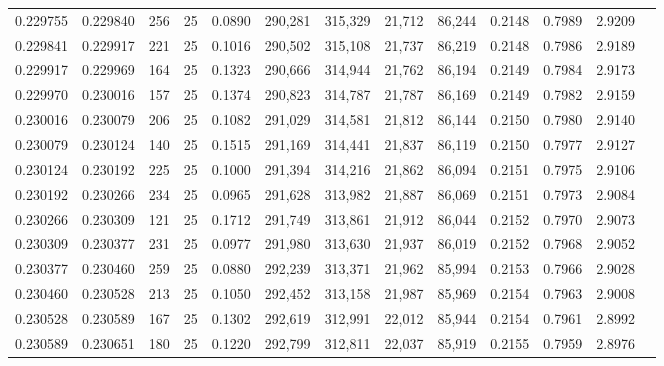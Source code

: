 \begin{tabular}{rrrrrrrrrrrrr}
0.229755 & 0.229840 &   256 &  25 &                                     0.0890 & 290,281 & 315,329 &  21,712 &  86,244 & 0.2148 & 0.7989 & 2.9209 \\
0.229841 & 0.229917 &   221 &  25 &                                     0.1016 & 290,502 & 315,108 &  21,737 &  86,219 & 0.2148 & 0.7986 & 2.9189 \\
0.229917 & 0.229969 &   164 &  25 &                                     0.1323 & 290,666 & 314,944 &  21,762 &  86,194 & 0.2149 & 0.7984 & 2.9173 \\
0.229970 & 0.230016 &   157 &  25 &                                     0.1374 & 290,823 & 314,787 &  21,787 &  86,169 & 0.2149 & 0.7982 & 2.9159 \\
0.230016 & 0.230079 &   206 &  25 &                                     0.1082 & 291,029 & 314,581 &  21,812 &  86,144 & 0.2150 & 0.7980 & 2.9140 \\
0.230079 & 0.230124 &   140 &  25 &                                     0.1515 & 291,169 & 314,441 &  21,837 &  86,119 & 0.2150 & 0.7977 & 2.9127 \\
0.230124 & 0.230192 &   225 &  25 &                                     0.1000 & 291,394 & 314,216 &  21,862 &  86,094 & 0.2151 & 0.7975 & 2.9106 \\
0.230192 & 0.230266 &   234 &  25 &                                     0.0965 & 291,628 & 313,982 &  21,887 &  86,069 & 0.2151 & 0.7973 & 2.9084 \\
0.230266 & 0.230309 &   121 &  25 &                                     0.1712 & 291,749 & 313,861 &  21,912 &  86,044 & 0.2152 & 0.7970 & 2.9073 \\
0.230309 & 0.230377 &   231 &  25 &                                     0.0977 & 291,980 & 313,630 &  21,937 &  86,019 & 0.2152 & 0.7968 & 2.9052 \\
0.230377 & 0.230460 &   259 &  25 &                                     0.0880 & 292,239 & 313,371 &  21,962 &  85,994 & 0.2153 & 0.7966 & 2.9028 \\
0.230460 & 0.230528 &   213 &  25 &                                     0.1050 & 292,452 & 313,158 &  21,987 &  85,969 & 0.2154 & 0.7963 & 2.9008 \\
0.230528 & 0.230589 &   167 &  25 &                                     0.1302 & 292,619 & 312,991 &  22,012 &  85,944 & 0.2154 & 0.7961 & 2.8992 \\
0.230589 & 0.230651 &   180 &  25 &                                     0.1220 & 292,799 & 312,811 &  22,037 &  85,919 & 0.2155 & 0.7959 & 2.8976 \\

\end{tabular}
